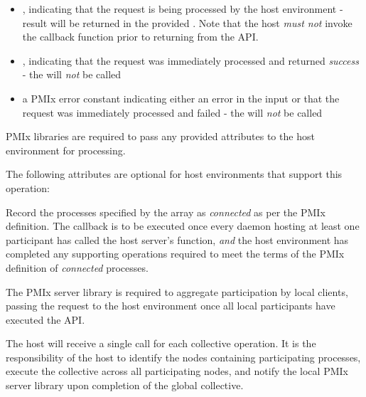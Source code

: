 \begin{itemize}
    \item {}, indicating that the request is being processed by the host environment - result will be returned in the provided . Note that the host \emph{must not} invoke the callback function prior to returning from the \ac{API}.
    \item {}, indicating that the request was immediately processed and returned \textit{success} - the  will \textit{not} be called
    \item a PMIx error constant indicating either an error in the input or that the request was immediately processed and failed - the  will \textit{not} be called
\end{itemize}

\reqattrstart
\ac{PMIx} libraries are required to pass any provided attributes to the host environment for processing.
\reqattrend

\optattrstart
The following attributes are optional for host environments that support this operation:


\optattrend

\descr

Record the processes specified by the  array as \textit{connected} as per the \ac{PMIx} definition. The callback is to be executed once every daemon hosting at least one participant has called the host server's  function, \textit{and} the host environment has completed any supporting operations required to meet the terms of the \ac{PMIx} definition of \textit{connected} processes.

\adviceimplstart
The \ac{PMIx} server library is required to aggregate participation by local clients, passing the request to the host environment once all local participants have executed the \ac{API}.
\adviceimplend

\advicermstart
The host will receive a single call for each collective operation. It is the responsibility of the host to identify the nodes containing participating processes, execute the collective across all participating nodes, and notify the local \ac{PMIx} server library upon completion of the global collective.
\advicermend


